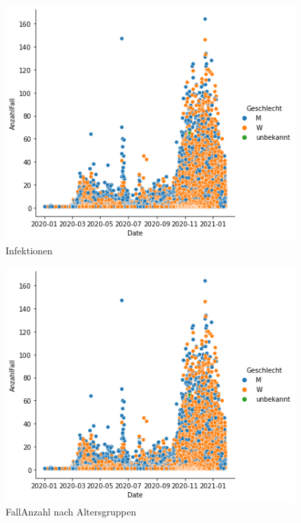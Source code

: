 \begin{figure}[H]
	\centering
	\includegraphics[scale = 0.8]{attachment/chapter_3/Scc085}
	\caption{Infektionen}
\end{figure} 
\begin{figure}[H]
	\centering
	\includegraphics[scale = 0.8]{attachment/chapter_3/Scc085}
	\caption{FallAnzahl nach Altersgruppen}
\end{figure} 

